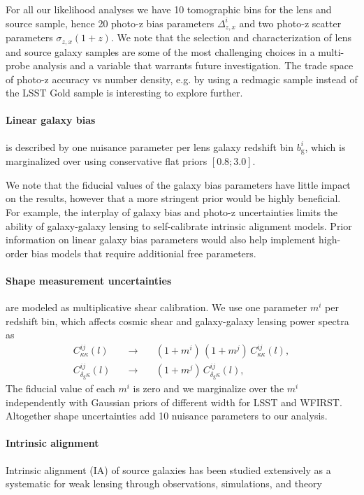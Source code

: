\documentclass[fleqn,usenatbib,useAMS]{mnras}
\newcommand{\bea}{\begin{eqnarray}}
\newcommand{\eea}{\end{eqnarray}}
\newcommand{\mr}{\mathrm}
\begin{document}
For all our likelihood analyses we have 10 tomographic bins for the lens and source sample, hence 20 photo-z bias parameters $\Delta^i_{z,x}$ and two photo-z scatter parameters $\sigma_{z,x}(1+z)$. We note that the selection and characterization of lens and source galaxy samples are some of the most challenging choices in a multi-probe analysis and a variable that warrants future investigation. The trade space of photo-z accuracy vs number density, e.g. by using a redmagic sample \citep{rra15} instead of the LSST Gold sample is interesting to explore further. 

\paragraph*{Linear galaxy bias} is described by one nuisance parameter per lens galaxy redshift bin $b_\mr{g}^i$, which is marginalized over using conservative flat priors $[0.8;3.0]$. 

We note that the fiducial values of the galaxy bias parameters have little impact on the results, however that a more stringent prior would be highly beneficial. For example, the interplay of galaxy bias and photo-z uncertainties limits the ability of galaxy-galaxy lensing to self-calibrate intrinsic alignment models. Prior information on linear galaxy bias parameters would also help implement high-order bias models that require additionial free parameters. 

\paragraph*{Shape measurement uncertainties} are modeled as multiplicative shear calibration. We use one parameter $m^i$ per redshift bin, which affects cosmic shear and galaxy-galaxy lensing power spectra as
\bea
\nonumber C_{\kappa \kappa}^{ij}(l) \quad &\longrightarrow& \quad (1+m^i) \, (1+m^j) \, C_{\kappa \kappa}^{ij}(l), \\
C_{\delta_{\mathrm{g}}\kappa}^{ij}(l) \quad &\longrightarrow& \quad (1+m^j) \, C_{\delta_{\mathrm{g}}\kappa}^{ij}(l),
\eea
The fiducial value of each $m^i$ is zero and we marginalize over the $m^i$ independently with Gaussian priors of different width for LSST and WFIRST. Altogether shape uncertainties add 10 nuisance  parameters to our analysis.

\paragraph*{Intrinsic alignment} 
Intrinsic alignment (IA) of source galaxies has been studied extensively as a systematic for weak lensing through observations, simulations, and theory \citep[e.g.,][]{his04,mhi06, job10, smm14, tri14,tsm15, bvs15} 
\end{document}
